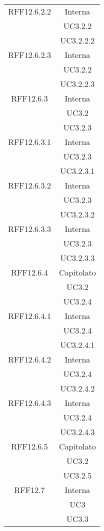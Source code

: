 \begin{longtable}{|c|c|}
\midrule
RFF12.6.2.2
& Interna\\
& UC3.2.2\\
& UC3.2.2.2\\

\midrule
RFF12.6.2.3
& Interna\\
& UC3.2.2\\
& UC3.2.2.3\\


\midrule
RFF12.6.3
& Interna\\
& UC3.2\\
& UC3.2.3\\

\midrule
RFF12.6.3.1
& Interna\\
& UC3.2.3\\
& UC3.2.3.1\\

\midrule
RFF12.6.3.2
& Interna\\
& UC3.2.3\\
& UC3.2.3.2\\

\midrule
RFF12.6.3.3
& Interna\\
& UC3.2.3\\
& UC3.2.3.3\\

\midrule
RFF12.6.4
& Capitolato\\
& UC3.2\\
& UC3.2.4\\

\midrule
RFF12.6.4.1
& Interna\\
& UC3.2.4\\
& UC3.2.4.1\\

\midrule
RFF12.6.4.2
& Interna\\
& UC3.2.4\\
& UC3.2.4.2\\

\midrule
RFF12.6.4.3
& Interna\\
& UC3.2.4\\
& UC3.2.4.3\\

\midrule
RFF12.6.5
& Capitolato\\
& UC3.2\\
& UC3.2.5\\

\midrule
RFF12.7
& Interna\\
& UC3\\
& UC3.3\\


\end{longtable}
